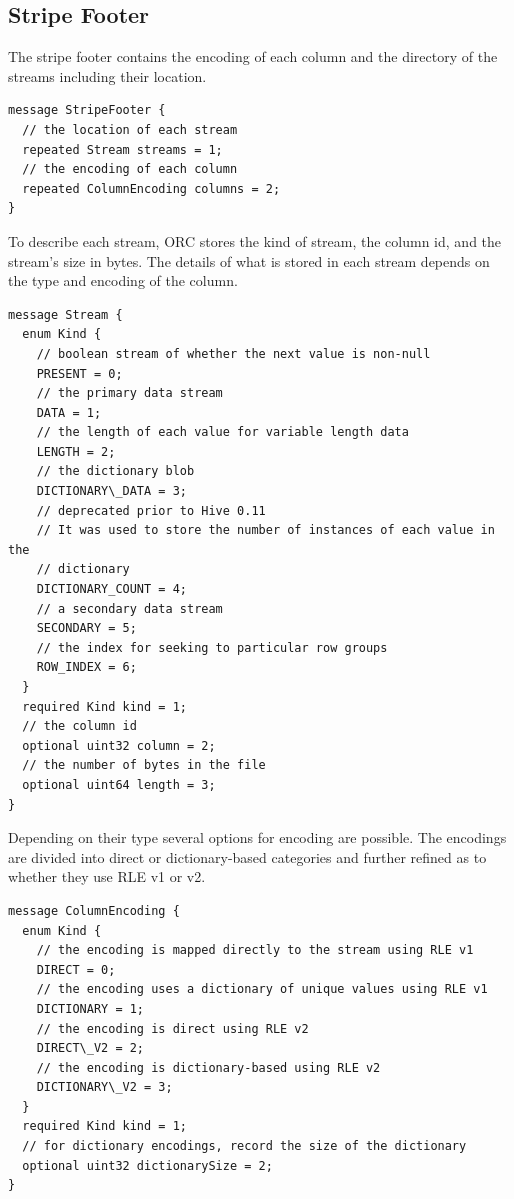 \documentclass{article}
\begin{document}
\subsection{Stripe Footer}

The stripe footer contains the encoding of each column and the
directory of the streams including their location.

\begin{verbatim}
message StripeFooter {
  // the location of each stream
  repeated Stream streams = 1;
  // the encoding of each column
  repeated ColumnEncoding columns = 2;
}
\end{verbatim}

To describe each stream, ORC stores the kind of stream, the column id,
and the stream's size in bytes. The details of what is stored in each stream
depends on the type and encoding of the column.

\begin{verbatim}
message Stream {
  enum Kind {
    // boolean stream of whether the next value is non-null
    PRESENT = 0;
    // the primary data stream
    DATA = 1;
    // the length of each value for variable length data
    LENGTH = 2;
    // the dictionary blob
    DICTIONARY\_DATA = 3;
    // deprecated prior to Hive 0.11
    // It was used to store the number of instances of each value in the 
    // dictionary
    DICTIONARY_COUNT = 4;
    // a secondary data stream
    SECONDARY = 5;
    // the index for seeking to particular row groups
    ROW_INDEX = 6;
  }
  required Kind kind = 1;
  // the column id
  optional uint32 column = 2;
  // the number of bytes in the file
  optional uint64 length = 3;
}
\end{verbatim}

Depending on their type several options for encoding are possible. The
encodings are divided into direct or dictionary-based categories and 
further refined as to whether they use RLE v1 or v2.

\begin{verbatim}
message ColumnEncoding {
  enum Kind {
    // the encoding is mapped directly to the stream using RLE v1
    DIRECT = 0;
    // the encoding uses a dictionary of unique values using RLE v1
    DICTIONARY = 1;
    // the encoding is direct using RLE v2
    DIRECT\_V2 = 2;
    // the encoding is dictionary-based using RLE v2
    DICTIONARY\_V2 = 3;
  }
  required Kind kind = 1;
  // for dictionary encodings, record the size of the dictionary
  optional uint32 dictionarySize = 2;
}
\end{verbatim}
\end{document}
